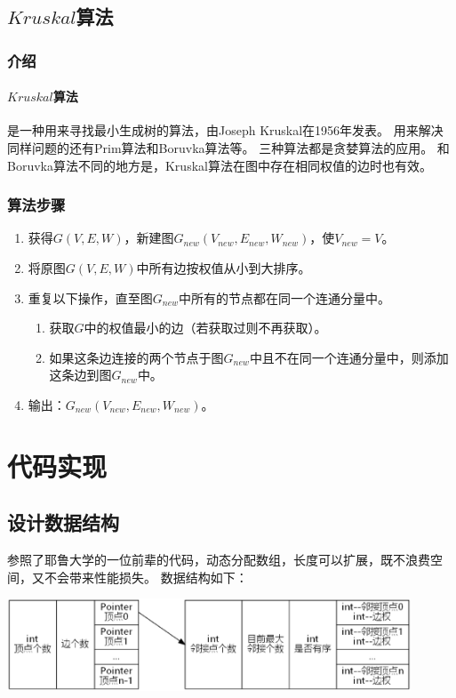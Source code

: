 \documentclass[a4paper,10pt]{ctexart}
\begin{document}
\subsection{$Kruskal$算法}
\subsubsection{介绍}
\paragraph{$Kruskal$算法}是一种用来寻找最小生成树的算法，由Joseph Kruskal在1956年发表。
用来解决同样问题的还有Prim算法和Boruvka算法等。
三种算法都是贪婪算法的应用。
和Boruvka算法不同的地方是，Kruskal算法在图中存在相同权值的边时也有效。
\subsubsection{算法步骤}
\begin{enumerate}
  \item 获得$G(V,E,W)$，新建图$G_{new}(V_{new},E_{new},W_{new})$，使$V_{new} = V$。
  \item 将原图$G(V,E,W)$中所有边按权值从小到大排序。
  \item 重复以下操作，直至图$G_{new}$中所有的节点都在同一个连通分量中。
      \begin{enumerate}
       \item 获取$G$中的权值最小的边（若获取过则不再获取）。
       \item 如果这条边连接的两个节点于图$G_{new}$中且不在同一个连通分量中，则添加这条边到图$G_{new}$中。
      \end{enumerate}
  \item 输出：$G_{new}(V_{new},E_{new},W_{new})$。
\end{enumerate}


\section{代码实现}
\subsection{设计数据结构}
参照了耶鲁大学的一位前辈的代码，动态分配数组，长度可以扩展，既不浪费空间，又不会带来性能损失。
数据结构如下：

\includegraphics[width=0.9\textwidth]{../Pics/DataStruct.eps}
\end{document}
